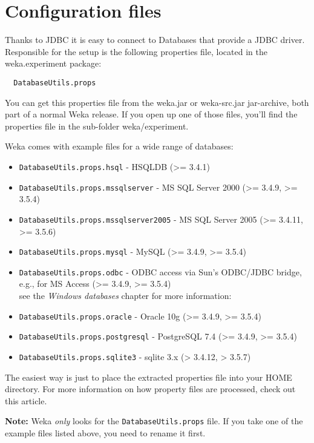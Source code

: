 
\section{Configuration files}
Thanks to JDBC it is easy to connect to Databases that provide a JDBC driver. Responsible for the setup is the following properties file, located in the weka.experiment package:

\begin{verbatim}
  DatabaseUtils.props
\end{verbatim}

\noindent You can get this properties file from the weka.jar or weka-src.jar jar-archive, both part of a normal Weka release. If you open up one of those files, you'll find the properties file in the sub-folder weka/experiment.

Weka comes with example files for a wide range of databases:

\begin{itemize}
	\item \texttt{DatabaseUtils.props.hsql} - HSQLDB (>= 3.4.1)
	\item \texttt{DatabaseUtils.props.mssqlserver} - MS SQL Server 2000 (>= 3.4.9, >= 3.5.4)
	\item \texttt{DatabaseUtils.props.mssqlserver2005} - MS SQL Server 2005 (>= 3.4.11, >= 3.5.6)
	\item \texttt{DatabaseUtils.props.mysql} - MySQL (>= 3.4.9, >= 3.5.4)
	\item \texttt{DatabaseUtils.props.odbc} - ODBC access via Sun's ODBC/JDBC bridge, e.g., for MS Access (>= 3.4.9, >= 3.5.4) \\
	see the \textit{Windows databases} chapter for more information:
	\item \texttt{DatabaseUtils.props.oracle} - Oracle 10g (>= 3.4.9, >= 3.5.4)
	\item \texttt{DatabaseUtils.props.postgresql} - PostgreSQL 7.4 (>= 3.4.9, >= 3.5.4)
	\item \texttt{DatabaseUtils.props.sqlite3} - sqlite 3.x (> 3.4.12, > 3.5.7)
\end{itemize}

The easiest way is just to place the extracted properties file into your HOME directory. For more information on how property files are processed, check out this article.

\textbf{Note:} Weka \textit{only} looks for the \texttt{DatabaseUtils.props} file. If you take one of the example files listed above, you need to rename it first.


